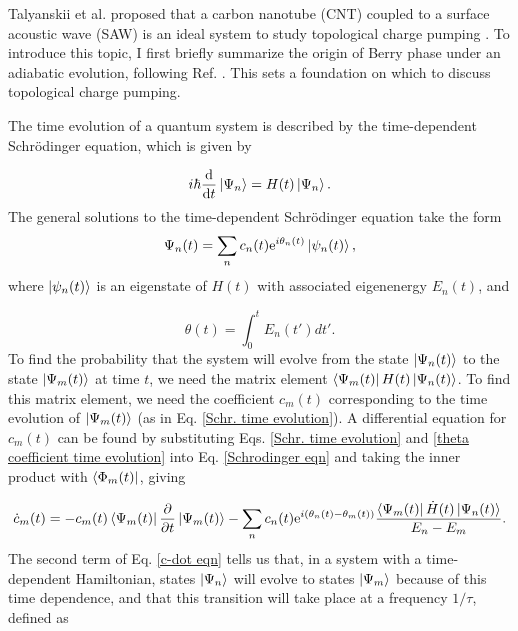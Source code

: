 \documentclass[double,12pt,1in]{beavtex}
\begin{document}
Talyanskii et al. proposed that a carbon nanotube (CNT) coupled to a surface acoustic wave (SAW) is an ideal system to study topological charge pumping \cite{talyanskii_quantized_2001}. To introduce this topic, I first briefly summarize the origin of Berry phase under an adiabatic evolution, following Ref. \cite[Ch. 5]{sakurai_modern_1985}. This sets a foundation on which to discuss topological charge pumping.

The time evolution of a quantum system is described by the time-dependent Schrödinger equation, which is given by

\begin{equation}
    i \hbar \derivative{t}\ket{\Psi_n} = H(t)\ket{\Psi_n}. \label{Schrodinger eqn}
\end{equation}
The general solutions to the time-dependent Schrödinger equation take the form
\begin{equation}
    {\Psi_n(t)} = \sum_n c_n(t) \mathrm{e}^{i \theta_n(t)} \ket{\psi_n(t)}, \label{Schr. time evolution}
\end{equation}
where $\ket{\psi_n(t)}$ is an eigenstate of $H(t)$ with associated eigenenergy $E_n(t)$, and 

\begin{equation}
    \theta(t) = \int_{0}^{t}E_n(t')dt'. \label{theta coefficient time evolution}
\end{equation}
To find the probability that the system will evolve from the state $\ket{\Psi_n(t)}$ to the state $\ket{\Psi_m(t)}$ at time $t$, we need the matrix element $\bra{\Psi_m(t)}H(t)\ket{\Psi_n(t)}$. To find this matrix element, we need the coefficient $c_m(t)$ corresponding to the time evolution of $\ket{\Psi_m(t)}$ (as in Eq. \ref{Schr. time evolution}). A differential equation for $c_m(t)$ can be found by substituting Eqs. \ref{Schr. time evolution} and \ref{theta coefficient time evolution} into Eq. \ref{Schrodinger eqn} and taking the inner product with $\bra{\Phi_m(t)}$, giving \cite[p. 347]{sakurai_modern_1985}

\begin{equation}
    \dot{c}_m(t) = - c_m(t) \bra{\Psi_m(t)}\pdv{t}\ket{\Psi_m(t)} - \sum_n c_n(t) \mathrm{e}^{i (\theta_n(t) - \theta_m(t))} \frac{\bra{\Psi_m(t)}\dot{H}(t)\ket{\Psi_n(t)}}{E_n - E_m}. \label{c-dot eqn}
\end{equation}
The second term of Eq. \ref{c-dot eqn} tells us that, in a system with a time-dependent Hamiltonian, states $\ket{\Psi_n}$ will evolve to states $\ket{\Psi_m}$ because of this time dependence, and that this transition will take place at a frequency $1/\tau$, defined as 
\end{document}
